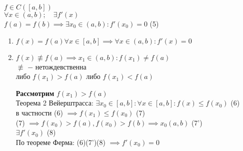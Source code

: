     \begin{theorem}
        $f \in C([a,b])$ \\
        $\forall x \in (a,b); \quad  \exists f'(x)$ \\
        $f(a)=f(b) \implies \exists x_0 \in (a,b): f'(x_0)=0$ (5)
    \end{theorem}
    \begin{replacementproof}
        \begin{enumerate}
            \item $f(x)=f(a) \forall x \in [a,b] \implies \forall x \in (a,b): f'(x)=0$
            \item $f(x) \not\equiv f(a) \implies x_1 \in (a,b): f(x_1) \neq f(a)$ \\
                 $\not\equiv$ $-$ нетождевственна\\
                 либо $f(x_1) > f(a)$ либо $f(x_1) < f(a)$ 
    
                 \textbf{Рассмотрим} $f(x_1)>f(a)$ \\
                 Теорема 2 Вейерштрасса:  $\exists x_0 \in [a,b]: \forall x \in [a,b]: f(x) \le f(x_0)$ (6)\\
                 в частности (6) $\implies f(x_1)\le f(x_0)$ (7)\\
                 (7) $\implies f(x_0) > f(a), f(x_0) > f(b) \implies x_0 (a,b)$ (7')\\
                 $\exists f'(x_0)$ (8)\\
                 По теореме Ферма: (6)(7')(8) $\implies f'(x_0)=0$
        \end{enumerate}
    \end{replacementproof}
    
    

